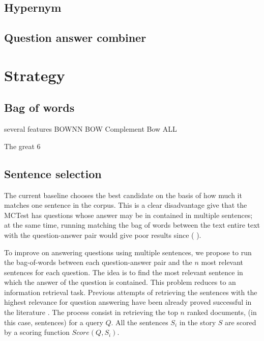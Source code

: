\documentclass[11pt]{article}
\begin{document}
\subsection{Hypernym}

\subsection{Question answer combiner}

\section{Strategy}
\subsection{Bag of words}
\label{sec:bagofwords}
several features
BOWNN
BOW Complement
Bow ALL

The great 6

\subsection{Sentence selection}
The current baseline chooses the best candidate on the basis of how much it matches one sentence in the corpus.
This is a clear disadvantage give that the MCTest has questions whose answer may be in contained in multiple sentences;
at the same time, running matching the bag of words between the text entire text with the question-answer pair would give poor results  since (%
).

To improve on answering questions using multiple sentences, we propose to run the bag-of-words between each question-answer pair and the $n$ most relevant sentences for each question.
The idea is to find the most relevant sentence in which the answer of the question is contained.
This problem reduces to an information retrieval task.
Previous attempts of retrieving the sentences with the highest relevance for question answering have been already proved successful in the literature \cite{qa_techniques, deep_selection}. %
The process consist in retrieving the top $n$ ranked documents, (in this case, sentences) for a query $Q$.
All the sentences $S_i$ in the story $S$ are scored by a scoring function $Score(Q, S_i)$.
\end{document}
